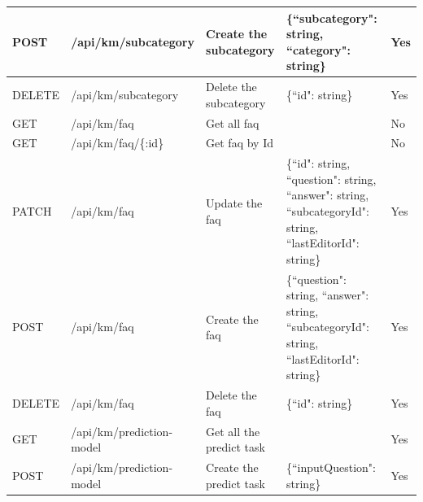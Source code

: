 \documentclass[12pt,oneside,openright,a4paper]{cpe-english-project}
\begin{document}
\begin{table}[h]
\begin{adjustbox}{width=\textwidth}
\begin{tabular}{|l|l|l|l|l|}
		POST	& /api/km/subcategory 		& Create the subcategory 	& \{``subcategory": string, ``category": string\} 	& Yes \\ \hline
		DELETE	& /api/km/subcategory 		& Delete the subcategory 	& \{``id": string\} 								& Yes \\ \hline
		GET		& /api/km/faq 				& Get all faq 				& 												& No \\ \hline
		GET		& /api/km/faq/\{:id\} 		& Get faq by Id 			& 												& No \\ \hline
		PATCH	& /api/km/faq 				& Update the faq 			& \{``id": string, ``question": string, ``answer": string, ``subcategoryId": string, ``lastEditorId": string\}			 & Yes \\ \hline
		POST	& /api/km/faq 				& Create the faq 			& \{``question": string, ``answer": string, ``subcategoryId": string, ``lastEditorId": string\}	& Yes \\ \hline
		DELETE	& /api/km/faq 				& Delete the faq 			& \{``id": string\} 								& Yes \\ \hline
		GET		& /api/km/prediction-model 	& Get all the predict task 	& 												& Yes \\ \hline
		POST	& /api/km/prediction-model 	& Create the predict task 	& \{``inputQuestion": string\}						& Yes \\ \hline
		\end{tabular}
	\end{adjustbox}
\end{table}



\end{document}
